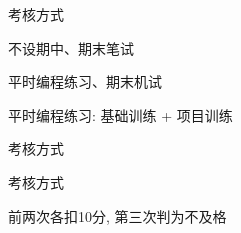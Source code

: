 
\begin{frame}{考核方式}
  \begin{center}
    不设期中、期末笔试

    \vspace{0.60cm}
    平时编程练习、期末机试

    \vspace{1.00cm}
    平时编程练习: 基础训练 + 项目训练
  \end{center}
\end{frame}

\begin{frame}{考核方式}
\end{frame}

\begin{frame}{考核方式}
  \begin{center}

    \vspace{0.30cm}
    前两次各扣10分, 第三次判为不及格
  \end{center}
\end{frame}
